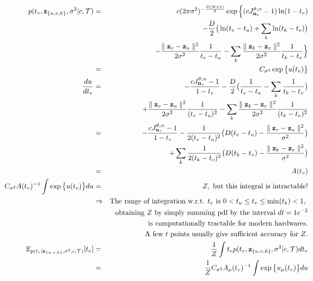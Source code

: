 \documentclass{article}
\begin{document}
	\begin{eqnarray}
	p(t_v, \bold{z}_{\{u,v,k\}}, \sigma^2 | c, \mathcal{T}) & = & c(2 \pi \sigma^2)^{-\frac{D(K + 1)}{2}}\exp \Big\{(cJ^{\theta,\alpha}_{\bold{n}_v} - 1)\ln(1 - t_v) \nonumber \\
	 & & - \frac{D}{2} \big( \ln(t_v - t_u) + \sum_k \ln(t_k - t_v) \big) \nonumber \\
	 & & - \frac{\parallel \bold{z}_v - \bold{z}_u\parallel^2}{2\sigma^2}\frac{1}{t_v - t_u} - \sum_k \frac{\parallel \bold{z}_k - \bold{z}_v\parallel^2}{2\sigma^2}\frac{1}{t_k - t_v} \Big\}  \nonumber\\
	 &=& C_{\sigma^2} \exp \big\{ u(t_v) \big\}\\
	\frac{du}{dt_v} &=& -\frac{cJ^{\theta,\alpha}_{\bold{n}_v} - 1}{1 - t_v} - \frac{D}{2}\big( \frac{1}{t_v - t_u} - \sum_k\frac{1}{t_k - t_v}\big) \nonumber \\
	 & & + \frac{\parallel \bold{z}_v - \bold{z}_u\parallel^2}{2\sigma^2}\frac{1}{(t_v - t_u)^2} - \sum_k \frac{\parallel \bold{z}_k - \bold{z}_v\parallel^2}{2\sigma^2}\frac{1}{(t_k - t_v)^2} \nonumber \\
	 &=& -\frac{cJ^{\theta,\alpha}_{\bold{n}_v} - 1}{1 - t_v} - \frac{1}{2(t_v - t_u)^2} \big(D(t_v - t_u) - \frac{\parallel \bold{z}_v - \bold{z}_u\parallel^2}{\sigma^2} \big) \nonumber \\
	 & & + \sum_k \frac{1}{2(t_k - t_v)^2} \big(D(t_k - t_v) - \frac{\parallel \bold{z}_k - \bold{z}_v\parallel^2}{\sigma^2} \big) \nonumber \\
	 &=& A(t_v)\\
	 C_{\sigma^2} A(t_v)^{-1} \int \exp \big\{u(t_v)\big\}du &=& Z, \textrm{ but this integral is intractable!} \\
	 &\Rightarrow & \textrm{The range of integration w.r.t. $t_v$ is $0 < t_u \leq t_v \leq \min(t_k) < 1$, } \nonumber \\
	 & & \textrm{obtaining $Z$ by simply summing pdf by the interval $dt = 1e^{-2}$} \nonumber \\
	 & & \textrm{is computationally tractable for modern hardwares.} \nonumber \\
	 & & \textrm{A few $t$ points usually give sufficient accuracy for $Z$.} \nonumber \\
	\mathbb{E}_{p(t_v | \bold{z}_{\{u,v,k\}}, \sigma^2, c, \mathcal{T})}[t_v] &=& \frac{1}{Z} \int t_v p(t_v, \bold{z}_{\{u,v,k\}}, \sigma^2 | c, \mathcal{T}) dt_v \nonumber \\
	&=& \frac{1}{Z} C_{\sigma^2} A_\mu(t_v)^{-1} \int \exp \big\{ u_\mu(t_v)\big\}du
	\end{eqnarray}
	
\end{document}
